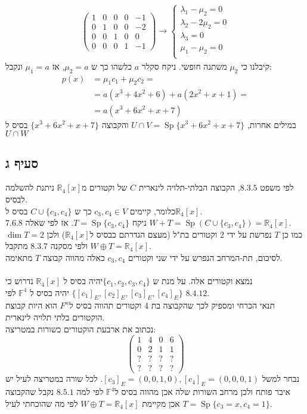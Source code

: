 \documentclass{article}
\DeclareMathOperator\Sp{Sp}
\def\reals{\mathbb{R}}
\begin{document}
\begin{align*}
    \begin{pmatrix}
        1 & 0 & 0 & 0 & -1 \\
        0 & 1 & 0 & 0 & -2 \\
        0 & 0 & 1 & 0 & 0  \\
        0 & 0 & 0 & 1 & -1
    \end{pmatrix}
    \rightarrow
    \begin{cases}
        \lambda_1-\mu_2=0  \\
        \lambda_2-2\mu_2=0 \\
        \lambda_3=0        \\
        \mu_1-\mu_2=0      \\
    \end{cases}
\end{align*}
קיבלנו כי $\mu_2$ משתנה חופשי. ניקח סקלר $a$ כלשהו כך ש $\mu_2=a$, אז $\mu_1=a$ ונקבל:
\begin{align*}
    p(x) & =\mu_1c_1+\mu_2c_2=          \\
         & =a(x^3+4x^2+6) +a(2x^2+x+1)= \\
         & = a(x^3+6x^2+x+7)
\end{align*}
במילים אחרות, $U\cap V=\Sp\{ x^3+6x^2+x+7 \}$ והקבוצה $\{ x^3+6x^2+x+7 \}$ בסיס ל$U\cap W$

\subsection*{סעיף ג}

לפי משפט $8.3.5$, הקבוצה הבלתי-תלויה לינארית $C$ של וקטורים מ$\reals_4[x]$ ניתנת להשלמה לבסיס. \\
כלומר, קיימים $c_3, c_4\in V$ כך ש $C\cup \{c_3, c_4\}$ בסיס ל$\reals_4[x]$. \\
ניקח $T=\Sp\{ c_3, c_4 \}$. אז לפי שאלה 7.6.8 $W+T=\Sp(C\cup \{c_3, c_4\})=\reals_4[x]$. \\
כמו כן $T$ נפרשת על ידי $2$ וקטורים בת"ל (מעצם הגדרתם כבסיס ל$\reals_4[x]$) ולכן $\dim T=2$ ולפי מסקנה $8.3.7$ מתקבל $W\oplus T=\reals_4[x]$. \\
לסיכום, תת-המרחב הנפרש על ידי שני וקטורים $c_3, c_4$ כאלה מהווה קבוצה $T$ מתאימה.
\\\\
נמצא וקטורים אלה. על מנת ש $\{ c_1, c_2, c_3, c_4 \}$יהיה בסיס ל $\reals_4[x]$ נדרוש כי $\{ [c_1]_E, [c_2]_E, [c_3]_E, [c_4]_E \}$ יהיה בסיס ל $\mathbb{F}^4$ לפי $8.4.12$. \\
תנאי הכרחי ומספיק לכך שהקבוצה בת 4 וקטורים תהווה בסיס ל$F^n$ הוא היות קבוצת הוקטורים בלתי תלויה לינארית. \\
נכתוב את ארבעת הוקטורים כשורות במטריצה:
\[
    \begin{pmatrix}
        1 & 4 & 0 & 6 \\
        0 & 2 & 1 & 1 \\
        ? & ? & ? & ? \\
        ? & ? & ? & ?
    \end{pmatrix}
\]
נבחר למשל $[c_3]_E=(0,0,1,0), [c_4]_E=(0,0,0,1)$. לכל שורה במטריצה לעיל יש איבר פותח ולכן מרחב השורות שלה אכן מהווה בסיס ל$\mathbb{F}^4$ לפי למה $8.5.1$
נקבל שהקבוצה $T=\Sp\{ c_3=x, c_4=1 \}$ אכן מקיימת $W\oplus T=\reals_4[x]$ לפי מה שהוכחתי לעיל.
\end{document}
